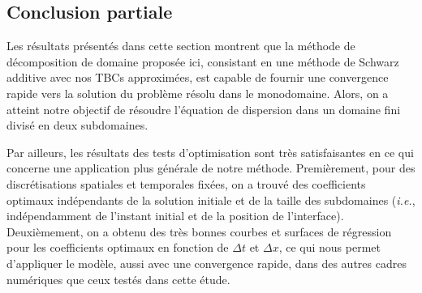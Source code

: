 \subsection{Conclusion partiale}
 
\indent Les résultats présentés dans cette section montrent que la méthode de décomposition de domaine proposée ici, consistant en une méthode de Schwarz additive avec nos TBCs approximées, est capable de fournir une convergence rapide vers la solution du problème résolu dans le monodomaine. Alors, on a atteint notre objectif de résoudre l'équation de dispersion dans un domaine fini divisé en deux subdomaines.

\indent Par ailleurs, les résultats des tests d'optimisation sont très satisfaisantes en ce qui concerne une application plus générale de notre méthode. Premièrement, pour des discrétisations spatiales et temporales fixées, on a trouvé des coefficients optimaux indépendants de la solution initiale et de la taille des subdomaines (\emph{i.e.}, indépendamment de l'instant initial et de la position de l'interface).  Deuxièmement, on a obtenu des très bonnes courbes et surfaces de régression pour les coefficients optimaux en fonction de $\Delta t$ et $\Delta x$, ce qui nous permet d'appliquer le modèle, aussi avec une convergence rapide, dans des autres cadres numériques que ceux testés dans cette étude.
